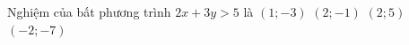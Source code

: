 \begin{ex}%
	Nghiệm của bất phương trình $2x+3y>5$ là
	\choice
		{$(1;-3)$}
		{$(2;-1)$}
		{\True $(2;5)$}
		{$(-2;-7)$}
\end{ex}
